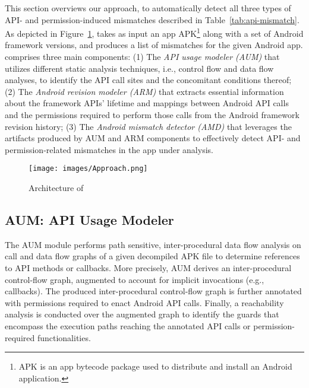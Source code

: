 This section overviews our approach, 
to automatically detect all three types
of API- and permission-induced mismatches described in
Table~\ref{tab:api-mismatch}. As depicted in
Figure~\ref{fig:arch}, \@approach takes as input an app
APK\footnote{APK is an app bytecode package used to
distribute and install an Android application.} along
with a set of Android framework versions, and produces
a list of mismatches for the given Android app.  
\@approach comprises three main components:
(1) The \textit{API usage modeler (AUM)} that utilizes
different static analysis techniques, i.e., control
flow and data flow analyses, to  identify the API call
sites and the concomitant conditions thereof; 
(2) The \textit{Android revision modeler (ARM)} that
extracts essential information about the framework
APIs' lifetime and mappings between Android API calls
and the permissions required to perform those calls
from the Android framework revision history;
(3) The \textit{Android mismatch detector (AMD)} that
leverages the artifacts produced by AUM and ARM
components to effectively detect API- and
permission-related mismatches in the app under
analysis.

 

\begin{figure}[t!]
    \centering
    \texttt{[image: images/Approach.png]}
    \vspace{-0.2cm}    
    \caption{Architecture of \@approach}
    \label{fig:arch}
    \vspace{-0.6cm}
\end{figure}

\subsection{AUM: API Usage Modeler}
\label{API Usage Extraction}

The AUM module performs path sensitive, inter-procedural
data flow analysis on call and data flow graphs of a given
decompiled APK file to determine references to API methods
or callbacks.  More precisely, AUM derives an
inter-procedural control-flow graph, augmented to account
for implicit invocations (e.g., callbacks). The produced inter-procedural
control-flow graph is further annotated with permissions
required to enact Android API calls. Finally, a reachability
analysis is conducted over the augmented graph to identify
the guards that encompass the execution paths reaching the
annotated API calls or permission-required functionalities. 


